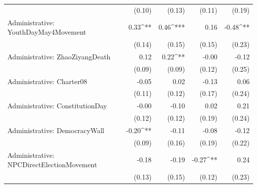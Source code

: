 \begin{table}
\begin{center}
\begin{tabular}{l D{.}{.}{6.5} D{.}{.}{6.5} D{.}{.}{6.5} D{.}{.}{6.5}}
                                                     & (0.10)                  & (0.13)                  & (0.11)                  & (0.19)                  \\
Administrative: YouthDayMay4Movement                 & 0.33^{**}               & 0.46^{***}              & 0.16                    & -0.48^{**}              \\
                                                     & (0.14)                  & (0.15)                  & (0.15)                  & (0.23)                  \\
Administrative: ZhaoZiyangDeath                      & 0.12                    & 0.22^{**}               & -0.00                   & -0.12                   \\
                                                     & (0.09)                  & (0.09)                  & (0.12)                  & (0.25)                  \\
Administrative: Charter08                            & -0.05                   & 0.02                    & -0.13                   & 0.06                    \\
                                                     & (0.11)                  & (0.12)                  & (0.17)                  & (0.24)                  \\
Administrative: ConstitutionDay                      & -0.00                   & -0.10                   & 0.02                    & 0.21                    \\
                                                     & (0.12)                  & (0.12)                  & (0.19)                  & (0.24)                  \\
Administrative: DemocracyWall                        & -0.20^{**}              & -0.11                   & -0.08                   & -0.12                   \\
                                                     & (0.09)                  & (0.16)                  & (0.19)                  & (0.22)                  \\
Administrative: NPCDirectElectionMovement            & -0.18                   & -0.19                   & -0.27^{**}              & 0.24                    \\
                                                     & (0.13)                  & (0.15)                  & (0.12)                  & (0.23)                  \\

\end{tabular}
\end{center}
\end{table}
